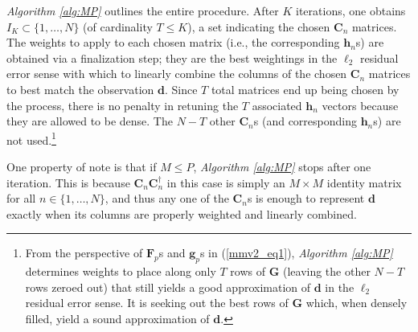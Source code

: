 \documentclass[final]{siamltex}
\newcommand{\la}[1]{\mbox{$\mathbf{#1}$}}  \newcommand{\sst}[1]{\mbox{\scriptsize{#1}}}
\begin{document}
   {\em{Algorithm \ref{alg:MP}}} outlines the entire procedure.
   After $K$ iterations, one obtains $I_K \subset \{1, \ldots, N \}$
   (of cardinality $T \leq K$), a set indicating the chosen $\la{C}_n$
   matrices.  The weights to apply to each chosen matrix (i.e., the
   corresponding $\la{h}_n$s) are obtained via a finalization step;
   they are the best weightings in the $\ell_2$ residual error sense
   with which to linearly combine the columns of the chosen $\la{C}_n$
   matrices to best match the observation \la{d}.  Since $T$ total
   matrices end up being chosen by the process, there is no penalty in
   retuning the $T$ associated $\la{h}_n$ vectors because they are
   allowed to be dense.  The $N - T$ other $\la{C}_n$s (and
   corresponding $\la{h}_n$s) are not used.\footnote{From the
   perspective of $\la{F}_p$s and $\la{g}_p$s in (\ref{mmv2_eq1}),
   {\em{Algorithm \ref{alg:MP}}} determines weights to place along
   only $T$ rows of $\la{G}$ (leaving the other $N - T$ rows zeroed
   out) that still yields a good approximation of \la{d} in the
   $\ell_2$ residual error sense.  It is seeking out the best rows of
   $\la{G}$ which, when densely filled, yield a sound approximation of
   $\la{d}$.}

   One property of note is that if $M \leq P$, {\em{Algorithm
   \ref{alg:MP}}} stops after one iteration.  This is because
   $\la{C}_n \la{C}_n^{\dagger}$ in this case is simply an $M \times
   M$ identity matrix for all $n \in \{1, \ldots, N \}$, and thus any
   one of the $\la{C}_n$s is enough to represent \la{d} exactly when
   its columns are properly weighted and linearly combined.
\end{document}
